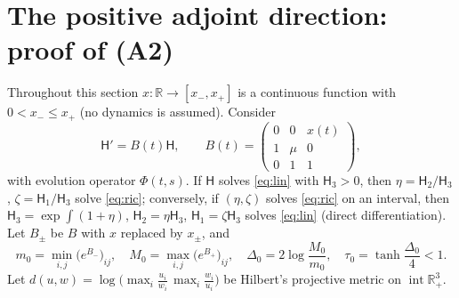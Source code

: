 \documentclass[11pt,a4paper]{article}
\numberwithin{equation}{section}
\theoremstyle{remark}\newtheorem{remark}[theorem]{Remark}
\newcommand{\R}{\mathbb R}
\DeclareMathOperator{\inter}{int}
\begin{document}
\section{The positive adjoint direction: proof of (A2)}\label{sec:adjoint}
Throughout this section $x:\R\to[x_-,x_+]$ is a continuous function with $0<x_-\le x_+$ (no dynamics is assumed).
Consider
\begin{equation}\label{eq:lin}
\mathsf H'=B(t)\mathsf H,\qquad B(t)=\begin{pmatrix}0&0&x(t)\\1&\mu&0\\0&1&1\end{pmatrix},
\end{equation}
with evolution operator $\Phi(t,s)$. If $\mathsf H$ solves \eqref{eq:lin} with $\mathsf H_3>0$, then
$\eta=\mathsf H_2/\mathsf H_3$, $\zeta=\mathsf H_1/\mathsf H_3$ solve \eqref{eq:ric}; conversely, if $(\eta,\zeta)$
solves \eqref{eq:ric} on an interval, then $\mathsf H_3=\exp\int(1+\eta)$, $\mathsf H_2=\eta\mathsf H_3$,
$\mathsf H_1=\zeta\mathsf H_3$ solves \eqref{eq:lin} (direct differentiation). Let $B_\pm$ be $B$ with $x$ replaced
by $x_\pm$, and
\[
m_0=\min_{i,j}\bigl(e^{B_-}\bigr)_{ij},\quad M_0=\max_{i,j}\bigl(e^{B_+}\bigr)_{ij},\quad
\Delta_0=2\log\frac{M_0}{m_0},\quad \tau_0=\tanh\frac{\Delta_0}{4}<1 .
\]
Let $d(u,w)=\log\bigl(\max_i\frac{u_i}{w_i}\,\max_i\frac{w_i}{u_i}\bigr)$ be Hilbert's projective metric on
$\inter\R^3_+$.
\end{document}
